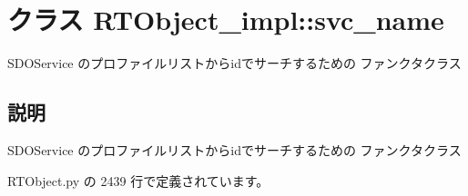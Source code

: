 \section{クラス RTObject\_\-impl::svc\_\-name}
\label{classsource__py_1_1_r_t_object_1_1_r_t_object__impl_1_1svc__name}
SDOService のプロファイルリストからidでサーチするための ファンクタクラス  




\subsection{説明}
SDOService のプロファイルリストからidでサーチするための ファンクタクラス 

 RTObject.py の 2439 行で定義されています。